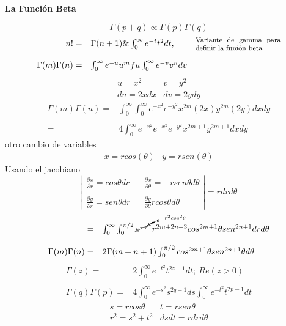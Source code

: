 \documentclass{article}
\theoremstyle{definition}
\begin{document}
\textbf{La Función Beta}

\[\Gamma (p+q)\propto \Gamma (p)\Gamma (q)\]
\[
\begin{array}{rlr}
	n!=& \Gamma (n+1)\& \int^{\infty}_0 e^{-t}t^2 dt,&\parbox{10em}{\footnotesize Variante de gamma para definir la funión beta} \\
	\\
	\Gamma (m)\Gamma (n)=& \int^{\infty}_0 e^{-u}u^m fu\int^{\infty}_0 e^{-v}v^n dv
\end{array}
\]
\[
\begin{array}{cc}
	u=x^2 & v=y^2\\
	du=2xdx & dv= 2ydy
\end{array}
\]
\[
\begin{array}{rl}
	\Gamma (m)\Gamma (n) =& \int^{\infty}_0 \int^{\infty}_0e^{-x^{2}}e^{-y^{2}}x^{2m}(2x)y^{2m}(2y)dxdy\\
	\\
	=& 4\int^{\infty}_0 e^{-x^{2}} e^{-x^{2}}e^{-y^{2}}x^{2m+1}y^{2m+1}dxdy
\end{array}
\]
otro cambio de variables
\[
\begin{array}{cc}
	x=rcos(\theta) & y=rsen(\theta)
\end{array}
\]
Usando el jacobiano
\[
\left|
\begin{array}{ccc}
	\frac{\partial x}{\partial r}= cos\theta dr && \frac{\partial x}{\partial \theta} =-rsen\theta d\theta\\
	\\
	\frac{\partial y}{\partial r} = sen\theta dr && \frac{\partial y}{\partial \theta} r cos\theta d\theta
\end{array}\right|
=rdrd\theta
\]
\[
\begin{array}{rl}
	=& \int^{\infty}_0\int^{\pi/2}_0 \cancelto{e^{-r^2cos^2\theta}}{e^{-r^2}} r^{2m+2n+3} cos^{2m+1}\theta sen ^{2n+1}drd\theta\\
	\\
	\Gamma (m)\Gamma (n) =& 2 \Gamma (m+n+1)\int^{\pi/2}_0 cos^{2m+1}\theta sen^{2n+1}\theta d\theta
\end{array}
\]
\[
\begin{array}{rl}
	\Gamma (z)=& 2 \int^{\infty}_0 e^{-t^2}t^{2z-1}dt;\ Re(z>0)\\
	\\
	\Gamma (q)\Gamma (p) =& 4\int^{\infty}_0 e^{-s^2} s^{2q-1}ds\int^{\infty}_0 e^{-t^2}t^{2p-1}dt
\end{array}
\]
\[
\begin{array}{cc}
	s=rcos\theta & t=rsen\theta\\
	r^2=s^2+t^2 & dsdt=rdrd\theta
\end{array}
\]
\end{document}
